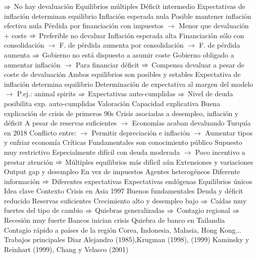 \documentclass{nuevotema}
\begin{document}
\begin{esquemal}
				\4[] $\then$ No hay devaluación
			\3 Equilibrios múltiples
				\4 Déficit intermedio
				\4 Expectativas de inflación determinan equilibrio
				\4 Inflación esperada nula
				\4[] Posible mantener inflación efectiva nula
				\4[] Pérdida por financiación con impuestos
				\4[] $\to$ Menor que devaluación + coste
				\4[] $\then$ Preferible no devaluar
				\4 Inflación esperada alta
				\4[] Financiación sólo con consolidación
				\4[] $\to$ F. de pérdida aumenta por consolidación
				\4[] $\to$ F. de pérdida aumenta
				\4[] $\then$ Gobierno no está dispuesto a asumir coste
				\4[] Gobierno obligado a aumentar inflación
				\4[] $\to$ Para financiar déficit
				\4[] $\then$ Compensa devaluar a pesar de coste de devaluación
				\4[$\then$] Ambos equilibrios son posibles y estables
				\4[] Expectativa de inflación determina equilibrio
				\4[] Determinación de expectativa al margen del modelo
				\4[] $\to$ P.ej.: animal spirits
				\4[] $\then$ Expectativas auto-cumplidas
				\4[] $\then$ Nivel de deuda posibilita exp. auto-cumplidas
		\2 Valoración
			\3 Capacidad explicativa
				\4 Buena explicación de crisis de primeros 90s
				\4 Crisis asociadas a desempleo, inflación y déficit
				\4[] A pesar de reservas suficientes
				\4[] $\to$ Economías acaban devaluando
				\4 Turquía en 2018
				\4[] Conflicto entre:
				\4[] $\to$ Permitir depreciación e inflación
				\4[] $\to$ Aumentar tipos y enfriar economía
			\3 Críticas
				\4 Fundamentales son conocimiento público
				\4[] Supuesto muy restrictivo
				\4[] Especialmente difícil con deuda moderada
				\4[] $\to$ Poco incentivo a prestar atención
				\4[] $\then$ Múltiples equilibrios más difícil aún
			\3 Extensiones y variaciones
				\4 Output gap y desempleo
				\4[] En vez de impuestos
				\4 Agentes heterogéneos
				\4[] Diferente información
				\4[] $\then$ Diferentes expectativas
				\4 Expectativas endógenas
				\4[] Equilibrios únicos
	\1 
		\2 Idea clave
			\3 Contexto
				\4 Crisis en Asia 1997
				\4[] Buenos fundamentales
				\4[] Deuda y déficit reducido
				\4[] Reservas suficientes
				\4[] Crecimiento alto y desempleo bajo
				\4[] $\then$ Caídas muy fuertes del tipo de cambio
				\4[] $\then$ Quiebras generalizadas
				\4[] $\then$ Contagio regional
				\4[] $\then$ Recesión muy fuerte
				\4 Bancos inician crisis
				\4[] Quiebra de banco en Tailandia
				\4 Contagio rápido a países de la región
				\4[] Corea, Indonesia, Malasia, Hong Kong...
				\4 Trabajos principales
				\4[] Diaz Alejandro (1985),Krugman (1998), (1999)
				\4[] Kaminsky y Reinhart (1999), Chang y Velasco (2001)

\end{esquemal}
\end{document}
